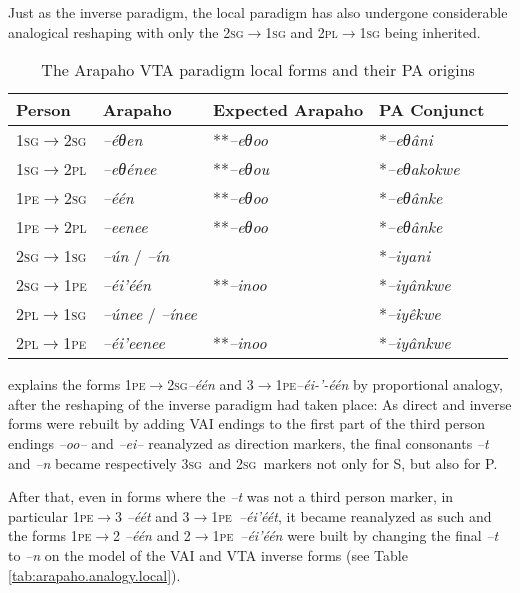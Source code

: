 \documentclass[twoside,a4paper,11pt]{article}
\newcommand{\ipa}[1]{{\phon\textit{#1}}}
\newcommand{\sg}{\textsc{sg}}
\newcommand{\pl}{\textsc{pl}}
\newcommand{\grise}[1]{\cellcolor{lightgray}\textbf{#1}}
\newcommand{\Σ}{\greek{Σ}}
\newcommand{\pe}{\textsc{pe}}
\begin{document}
Just as the inverse paradigm, the local paradigm has also undergone considerable analogical reshaping with only the 2\sg{}$\rightarrow$1\sg{} and 2\pl{}$\rightarrow$1\sg{} being inherited. 

\begin{table}[H]
\caption{The Arapaho VTA paradigm local forms and their PA origins}
\centering \label{tab:vta.3}
\begin{tabular}{lllll}
\toprule
Person & Arapaho & Expected Arapaho&PA Conjunct    \\
\midrule
1\sg$\rightarrow$2\sg & \ipa{--éθen} \grise{}& **\ipa{--eθoo} &*\ipa{--eθâni}   \\
1\sg$\rightarrow$2\pl &\ipa{--eθénee} \grise{}& **\ipa{--eθou} &*\ipa{--eθakokwe} & \\
1\pe$\rightarrow$2\sg &\ipa{--één} \grise{}& **\ipa{--eθoo} &*\ipa{--eθânke} &   \\
1\pe$\rightarrow$2\pl &\ipa{--eenee} \grise{}& **\ipa{--eθoo} &*\ipa{--eθânke} &   \\
\midrule 
2\sg$\rightarrow$1\sg &\ipa{--ún} / \ipa{--ín} &   & *\ipa{--iyani}     \\
2\sg$\rightarrow$1\pe & \ipa{--éi'één}\grise{}& **\ipa{--inoo}&*\ipa{--iyânkwe} &  \\
2\pl$\rightarrow$1\sg &\ipa{--únee} / \ipa{--ínee} &  &*\ipa{--iyêkwe} &   \\
2\pl$\rightarrow$1\pe &\ipa{--éi'eenee}\grise{} & **\ipa{--inoo}&*\ipa{--iyânkwe} &   \\
\bottomrule
\end{tabular}
\end{table}

\citet[23]{goddard65arapaho} explains the forms 1\pe$\rightarrow$2\sg \ipa{--één} and 3$\rightarrow$1\pe \ipa{--éi-'-één} by proportional analogy, after the reshaping of the inverse paradigm had taken place: As direct and inverse forms were rebuilt by adding VAI endings to the first part of the third person endings \ipa{--oo--} and \ipa{--ei--} reanalyzed as direction markers, the final consonants \ipa{--t} and \ipa{--n} became   respectively 3\sg\ and 2\sg\ markers not only for  S, but also for P.

After that, even in forms where the \ipa{--t} was not a third person marker, in particular  1\pe$\rightarrow$3   \ipa{--éét} and   3$\rightarrow$1\pe\   \ipa{--éi'éét}, it became reanalyzed as such and the forms  1\pe$\rightarrow$2   \ipa{--één} and   2$\rightarrow$1\pe\   \ipa{--éi'één} were built by changing the final \ipa{--t} to \ipa{--n} on the model of the VAI and VTA inverse forms (see Table  \ref{tab:arapaho.analogy.local}).
\end{document}
